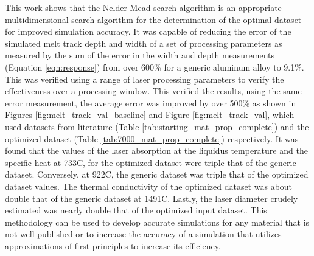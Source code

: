 \label{conclusions}

This work shows that the Nelder-Mead search algorithm is an appropriate multidimensional search algorithm for the determination of the optimal dataset for improved simulation accuracy.  
It was capable of reducing the error of the simulated melt track depth and width of a set of processing parameters as measured by the sum of the error in the width and depth measurements (Equation \ref{eqn:response}) from over 600\% for a generic aluminum alloy to 9.1\%.
This was verified using a range of laser processing parameters to verify the effectiveness over a processing window.  This verified the results, using the same error measurement, the average error was improved by over 500\%
as shown in Figures \ref{fig:melt_track_val_baseline} and Figure \ref{fig:melt_track_val}, which used datasets from literature (Table \ref{tab:starting_mat_prop_complete}) and the optimized dataset (Table \ref{tab:7000_mat_prop_complete}) respectively.  
It was found that the values of the laser absorption at the liquidus temperature and the specific heat at 733\degree C, for the optimized dataset were triple that of the generic dataset.  Conversely, at 922\degree C, the generic dataset was triple that of the optimized dataset values.  The thermal conductivity of the optimized dataset was about double that of the generic dataset at 1491\degree C.  Lastly, the laser diameter crudely estimated was nearly double that of the optimized input dataset.
This methodology can be used to develop accurate simulations for any material that is not well published or to increase the accuracy of a simulation that utilizes approximations of first principles to increase its efficiency.